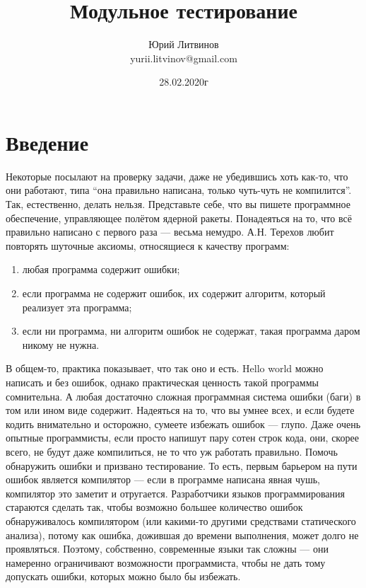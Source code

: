 \documentclass[a5paper]{article}
\title{Модульное тестирование}
\author{Юрий Литвинов\\\small{yurii.litvinov@gmail.com}}
\date{28.02.2020г}
\begin{document}
\maketitle
\thispagestyle{empty}

\section{Введение}

Некоторые посылают на проверку задачи, даже не убедившись хоть как-то, что они работают, типа ``она правильно написана, только чуть-чуть не компилится''. Так, естественно, делать нельзя. Представьте себе, что вы пишете программное обеспечение, управляющее полётом ядерной ракеты. Понадеяться на то, что всё правильно написано с первого раза --- весьма немудро. А.Н. Терехов любит повторять шуточные аксиомы, относящиеся к качеству программ:

\begin{enumerate}
    \item любая программа содержит ошибки;
    \item если программа не содержит ошибок, их содержит алгоритм, который реализует эта программа;
    \item если ни программа, ни алгоритм ошибок не содержат, такая программа даром никому не нужна.
\end{enumerate}

В общем-то, практика показывает, что так оно и есть. Hello world можно написать и без ошибок, однако практическая ценность такой программы сомнительна. А любая достаточно сложная программная система ошибки (баги) в том или ином виде содержит. Надеяться на то, что вы умнее всех, и если будете кодить внимательно и осторожно, сумеете избежать ошибок --- глупо. Даже очень опытные программисты, если просто напишут пару сотен строк кода, они, скорее всего, не будут даже компилиться, не то что уж работать правильно. Помочь обнаружить ошибки и призвано тестирование. То есть, первым барьером на пути ошибок является компилятор --- если в программе написана явная чушь, компилятор это заметит и отругается. Разработчики языков программирования стараются сделать так, чтобы возможно большее количество ошибок обнаруживалось компилятором (или какими-то другими средствами статического анализа), потому как ошибка, дожившая до времени выполнения, может долго не проявляться. Поэтому, собственно, современные языки так сложны --- они намеренно ограничивают возможности программиста, чтобы не дать тому допускать ошибки, которых можно было бы избежать.
\end{document}
